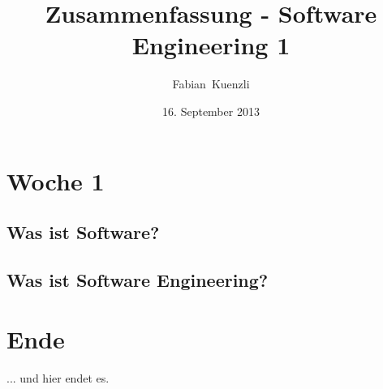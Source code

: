 \documentclass[11pt,a4paper,ngerman]{article}
\date{16. September 2013}
\author{Fabian~Kuenzli}
\title{Zusammenfassung - Software Engineering 1}
\begin{document}
\maketitle
\newpage
\tableofcontents
\newpage
\section{Woche 1}
\subsection{Was ist Software?}
\subsection{Was ist Software Engineering?}
\newpage
\section{Ende}
... und hier endet es.
\end{document}

